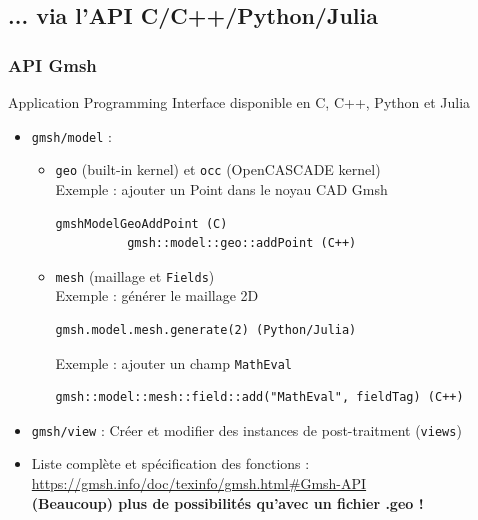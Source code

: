 \documentclass[aspectratio=169]{beamer}
\begin{document}
\subsection{... via l'API C/C++/Python/Julia}

\begin{frame}[fragile]
\frametitle{API Gmsh}
  Application Programming Interface disponible en C, C++, Python et Julia \\
  \begin{itemize}
    \item \texttt{gmsh/model} :
    \begin{itemize}
      \item \texttt{geo} (built-in kernel) et \texttt{occ} (OpenCASCADE kernel)\\
       Exemple : ajouter un Point dans le noyau CAD Gmsh
        \begin{lstlisting}[frame=none, aboveskip=0mm, belowskip=0mm]
          gmshModelGeoAddPoint (C)
          gmsh::model::geo::addPoint (C++)
        \end{lstlisting}
      \item \texttt{mesh} (maillage et \texttt{Fields})\\
        Exemple : générer le maillage 2D
        \begin{lstlisting}[frame=none, aboveskip=0mm, belowskip=0mm]
          gmsh.model.mesh.generate(2) (Python/Julia)
        \end{lstlisting}
        Exemple : ajouter un champ \texttt{MathEval}
        \begin{lstlisting}[frame=none, aboveskip=0mm, belowskip=0mm]
          gmsh::model::mesh::field::add("MathEval", fieldTag) (C++)
        \end{lstlisting}
    \end{itemize}
    \item \texttt{gmsh/view} : Créer et modifier des instances de post-traitment (\texttt{views})
    \item Liste complète et spécification des fonctions : \url{https://gmsh.info/doc/texinfo/gmsh.html#Gmsh-API}\\
    \textbf{(Beaucoup) plus de possibilités qu'avec un fichier .geo !}
  \end{itemize}

\end{frame}
\end{document}
